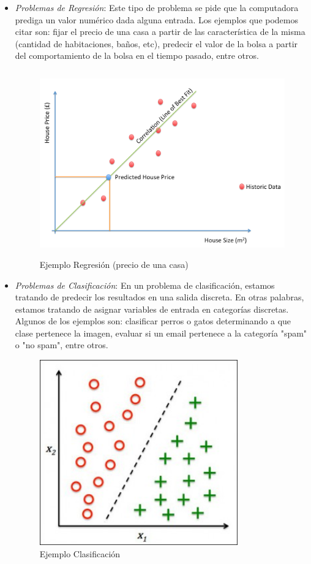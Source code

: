 \begin{itemize}
\item \textit{Problemas de Regresión}: Este tipo de problema se pide que la computadora prediga un valor numérico dada alguna entrada. Los ejemplos que podemos citar son: fijar el precio de una casa a partir de las característica de la misma (cantidad de habitaciones, baños, etc), predecir el valor de la bolsa a partir del comportamiento de la bolsa en el tiempo pasado, entre otros.

\begin{figure}[H] \centering
  \includegraphics[height=8cm,keepaspectratio=true,clip=true]{imagenes/MarcoTeorico/regression_linear.png}
  \caption{Ejemplo Regresión (precio de una casa)}\label{Fig:regression}
\end{figure}

\item \textit{Problemas de Clasificación}: En un problema de clasificación, estamos tratando de predecir los resultados en una
salida discreta. En otras palabras, estamos tratando de asignar variables de entrada en categorías discretas. Algunos de los ejemplos son: clasificar perros o gatos determinando a que clase pertenece la imagen, evaluar si un email pertenece a la categoría "spam" o "no spam", entre otros.

\begin{figure}[H] \centering
  \includegraphics[height=8cm,keepaspectratio=true,clip=true]{imagenes/MarcoTeorico/classification.jpg}
  \caption{Ejemplo Clasificación}\label{Fig:clasificacion}
\end{figure}



\end{itemize}
